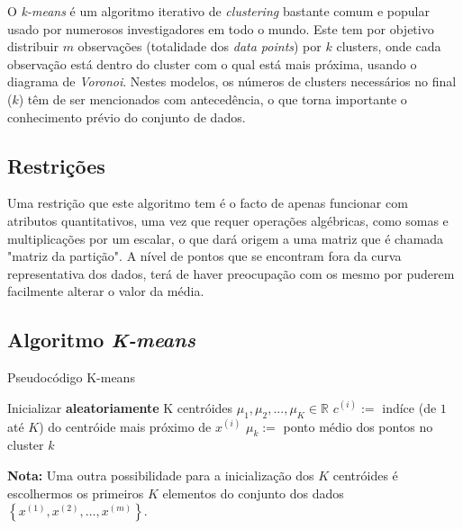 \documentclass[12pt, a4paper, oneside]{scrreport}
\begin{document}
\quad O \textit{k-means} é um algoritmo iterativo de \textit{clustering} bastante comum e popular usado por numerosos investigadores em todo o mundo. Este tem por objetivo distribuir $m$ observações (totalidade dos \textit{data points}) por $k$ clusters, onde cada observação está dentro do cluster com o qual está mais próxima, usando o diagrama de \textit{Voronoi}.
Nestes modelos, os números de clusters necessários no final ($k$) têm de ser mencionados com antecedência, o que torna importante o conhecimento prévio do conjunto de dados. \cite{kmeans}
\vspace{-0.5cm}
\subsection{Restrições}
\quad Uma restrição que este algoritmo tem é o facto de apenas funcionar com atributos quantitativos, uma vez que requer operações algébricas, como somas e multiplicações por um escalar, o que dará origem a uma matriz que é chamada "matriz da partição". A nível de pontos que se encontram fora da curva representativa dos dados, terá de haver preocupação com os mesmo por puderem facilmente alterar o valor da média. 
\subsection{Algoritmo \textit{K-means}}

\begin{algorithm}
\caption{Pseudocódigo K-means}\label{kmeans}
\begin{algorithmic}
\State Inicializar \textbf{aleatoriamente} K centróides $\mu_1, \mu_2, ..., \mu_K \in \mathbb{R}$
\Repeat
	 \color{uminho}
	\State$c^{(i)} := $ indíce (de $1$ até $K$) do centróide mais próximo de $x^{(i)}$ \color{uminho!70!black} 
	\EndFor
	 \color{uminho}
	\State $\mu_k := $ ponto médio dos pontos no cluster $k$
	\EndFor
{}

\EndProcedure
\end{algorithmic}
\end{algorithm}
\textbf{Nota:} Uma outra possibilidade para a inicialização dos $K$ centróides é escolhermos os primeiros $K$ elementos do conjunto dos dados $\left\{x^{(1)}, x^{(2)},\ldots, x^{(m)}\right\}$.
\end{document}
